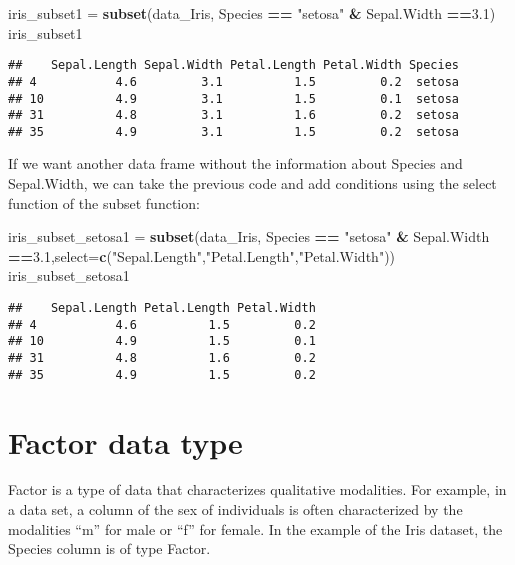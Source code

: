 \documentclass[
]{article}
\newenvironment{Shaded}{\begin{snugshade}}{\end{snugshade}}
\newcommand{\AttributeTok}[1]{\textcolor[rgb]{0.13,0.29,0.53}{#1}}
\newcommand{\FloatTok}[1]{\textcolor[rgb]{0.00,0.00,0.81}{#1}}
\newcommand{\FunctionTok}[1]{\textcolor[rgb]{0.13,0.29,0.53}{\textbf{#1}}}
\newcommand{\NormalTok}[1]{#1}
\newcommand{\OtherTok}[1]{\textcolor[rgb]{0.56,0.35,0.01}{#1}}
\newcommand{\SpecialCharTok}[1]{\textcolor[rgb]{0.81,0.36,0.00}{\textbf{#1}}}
\newcommand{\StringTok}[1]{\textcolor[rgb]{0.31,0.60,0.02}{#1}}
\begin{document}
\begin{Shaded}
\begin{Highlighting}[]
\NormalTok{iris\_subset1 }\OtherTok{=} \FunctionTok{subset}\NormalTok{(data\_Iris, Species }\SpecialCharTok{==} \StringTok{"setosa"} \SpecialCharTok{\&}\NormalTok{ Sepal.Width }\SpecialCharTok{==}\FloatTok{3.1}\NormalTok{)}
\NormalTok{iris\_subset1}
\end{Highlighting}
\end{Shaded}

\begin{verbatim}
##    Sepal.Length Sepal.Width Petal.Length Petal.Width Species
## 4           4.6         3.1          1.5         0.2  setosa
## 10          4.9         3.1          1.5         0.1  setosa
## 31          4.8         3.1          1.6         0.2  setosa
## 35          4.9         3.1          1.5         0.2  setosa
\end{verbatim}

If we want another data frame without the information about Species and
Sepal.Width, we can take the previous code and add conditions using the
select function of the subset function:

\begin{Shaded}
\begin{Highlighting}[]
\NormalTok{iris\_subset\_setosa1 }\OtherTok{=} \FunctionTok{subset}\NormalTok{(data\_Iris, Species }\SpecialCharTok{==} \StringTok{"setosa"} \SpecialCharTok{\&}\NormalTok{ Sepal.Width }\SpecialCharTok{==}\FloatTok{3.1}\NormalTok{,}\AttributeTok{select=}\FunctionTok{c}\NormalTok{(}\StringTok{"Sepal.Length"}\NormalTok{,}\StringTok{"Petal.Length"}\NormalTok{,}\StringTok{"Petal.Width"}\NormalTok{))}
\NormalTok{iris\_subset\_setosa1}
\end{Highlighting}
\end{Shaded}

\begin{verbatim}
##    Sepal.Length Petal.Length Petal.Width
## 4           4.6          1.5         0.2
## 10          4.9          1.5         0.1
## 31          4.8          1.6         0.2
## 35          4.9          1.5         0.2
\end{verbatim}

\hypertarget{factor-data-type}{%
\section{Factor data type}\label{factor-data-type}}

Factor is a type of data that characterizes qualitative modalities. For
example, in a data set, a column of the sex of individuals is often
characterized by the modalities ``m'' for male or ``f'' for female. In
the example of the Iris dataset, the Species column is of type Factor.
\end{document}
